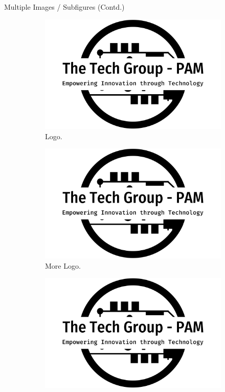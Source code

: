 \documentclass{beamer}
\begin{document}
\begin{frame}{Multiple Images / Subfigures (Contd.)}
  \begin{figure}[h!]
    \centering
    \begin{subfigure}[b]{0.2\linewidth}
      \includegraphics[width=\linewidth]{../images/the-tech-group-pam-high-resolution-logo-black-on-transparent-background_01.png}
       \caption{Logo.}
    \end{subfigure}
    \begin{subfigure}[b]{0.2\linewidth}
      \includegraphics[width=\linewidth]{../images/the-tech-group-pam-high-resolution-logo-black-on-transparent-background_01.png}
      \caption{More Logo.}
    \end{subfigure}
    \begin{subfigure}[b]{0.2\linewidth}
      \includegraphics[width=\linewidth]{../images/the-tech-group-pam-high-resolution-logo-black-on-transparent-background_01.png}

\end{subfigure}
\end{figure}
\end{frame}
\end{document}
